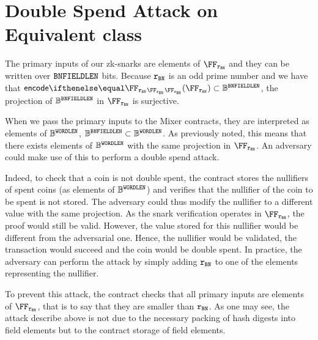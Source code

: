\chapter{Double Spend Attack on Equivalent class}\label{appendix:dbspd}

The primary inputs of our zk-snarks are elements of $\FFx{\rBN}$ and they can be written over $ \mathtt{BNFIELDLEN} $ bits. Because $\mathtt{r_{BN}}$ is an odd prime number and we have that $\encode{\FFx{\rBN}}{\FFx{\rBN}} \subset \BB^\bnFieldBitLen$, the projection of $\mathbb{B}^{\mathtt{BNFIELDLEN}}$ in $\FFx{\rBN}$ is surjective.

When we pass the primary inputs to the Mixer contracts, they are interpreted as elements of $\mathbb{B}^{\mathtt{WORDLEN}}$, $ \mathbb{B}^{\mathtt{BNFIELDLEN}} \subset \mathbb{B}^{\mathtt{WORDLEN}} $. As previously noted, this means that there exists elements of $\mathbb{B}^{\mathtt{WORDLEN}}$ with the same projection in $\FFx{\rBN}$. An adversary could make use of this to perform a double spend attack.

Indeed, to check that a coin is not double spent, the contract stores the nullifiers of spent coins (as elements of $\mathbb{B}^{\mathtt{WORDLEN}}$) and verifies that the nullifier of the coin to be spent is not stored. The adversary could thus modify the nullifier to a different value with the same projection. As the snark verification operates in $\FFx{\rBN}$, the proof would still be valid. However, the value stored for this nullifier would be different from the adversarial one. Hence, the nullifier would be validated, the transaction would succeed and the coin would be double spent.
In practice, the adversary can perform the attack by simply adding $\mathtt{r_{BN}}$ to one of the elements representing the nullifier.

To prevent this attack, the contract checks that all primary inputs are elements of $\FFx{\rBN}$, that is to say that they are smaller than $\mathtt{r_{BN}}$.
As one may see, the attack describe above is not due to the necessary packing of hash digests into field elements but to the contract storage of field elements.